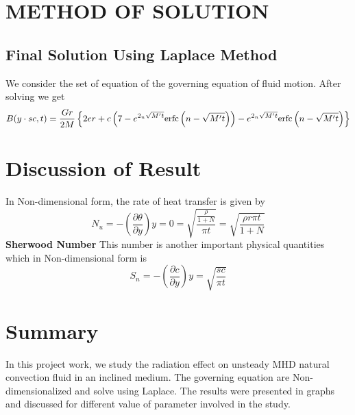 \documentclass[12pt]{report}
\newcommand{\bt}[1]{\textbf{#1}}
\begin{document}
	\chapter{METHOD OF SOLUTION}
	\section{Final Solution Using Laplace Method}
	We consider the set of equation of the governing equation of fluid motion. After solving we get
	\begin{eqnarray}
		B(y\cdot sc,t) = \frac{Gr}{2M}\left\{2er + c \left(7 - e^{2_n\sqrt{M't}}\mbox{erfc}\left(n-\sqrt{M't}\right)\right) - e^{2_n\sqrt{M't}}\mbox{erfc}\left(n-\sqrt{M't}\right) \right\}\notag
	\end{eqnarray}
	
	
	\chapter{Discussion of Result}
	In Non-dimensional form, the rate of heat transfer is given by
	\begin{equation*}
		N_u = -\left(\frac{\partial \theta}{\partial y}\right)y = 0 = \sqrt{\frac{\frac{\rho}{1 + N}}{\pi t}} = \sqrt{\frac{\rho r\pi t}{1 + N}}
	\end{equation*}
	\bt{Sherwood Number}
	This number is another important physical quantities which in Non-dimensional form is 
	\begin{equation*}
		S_n = -\left(\frac{\partial c}{\partial y}\right)y = \sqrt{\frac{sc}{\pi t}}
	\end{equation*}
	\chapter{Summary}
	In this project work, we study the radiation effect on unsteady MHD natural convection fluid in an inclined medium. The governing equation are Non-dimensionalized and solve using Laplace. The results were presented in graphs and discussed for different value of parameter involved in the study.
	
	
	
\end{document}

